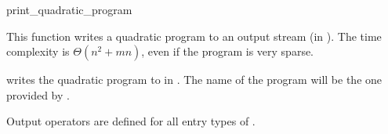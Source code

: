 \begin{ccRefFunction}{print_quadratic_program}


This function writes a quadratic program to an output stream (in 
). The time complexity is $\Theta (n^2 + mn)$, even 
if the program is very sparse.

{writes the quadratic program  to  in .
The name of the program will be the one provided by .}

Output operators are defined for all entry types of .

\end{ccRefFunction}

